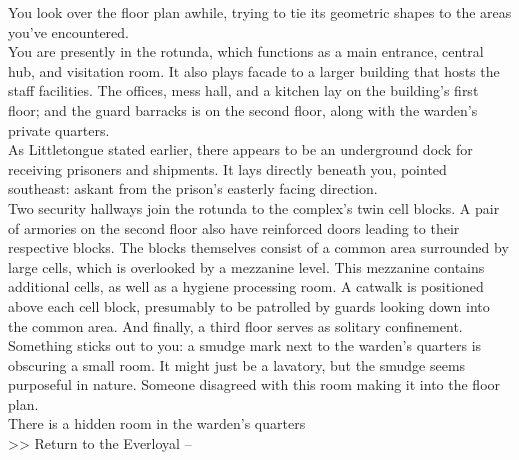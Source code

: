You look over the floor plan awhile, trying to tie its geometric shapes to the areas you’ve encountered.\\

You are presently in the rotunda, which functions as a main entrance, central hub, and visitation room. It also plays facade to a larger building that hosts the staff facilities. The offices, mess hall, and a kitchen lay on the building’s first floor; and the guard barracks is on the second floor, along with the warden’s private quarters.\\

As Littletongue stated earlier, there appears to be an underground dock for receiving prisoners and shipments. It lays directly beneath you, pointed southeast: askant from the prison’s easterly facing direction.\\

Two security hallways join the rotunda to the complex’s twin cell blocks. A pair of armories on the second floor also have reinforced doors leading to their respective blocks. The blocks themselves consist of a common area surrounded by large cells, which is overlooked by a mezzanine level. This mezzanine contains additional cells, as well as a hygiene processing room. A catwalk is positioned above each cell block, presumably to be patrolled by guards looking down into the common area. And finally, a third floor serves as solitary confinement.\\

Something sticks out to you: a smudge mark next to the warden’s quarters is obscuring a small room. It might just be a lavatory, but the smudge seems purposeful in nature. Someone disagreed with this room making it into the floor plan.\\
 There is a hidden room in the warden’s quarters\\

>>  Return to the Everloyal -- 